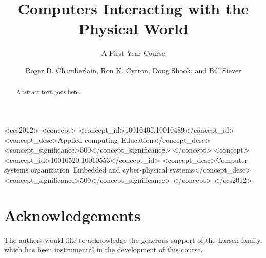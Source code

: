 \documentclass[sigconf]{acmart}
\begin{document}
\title{Computers Interacting with the Physical World}
\subtitle{A First-Year Course}


\author{Roger D. Chamberlain, Ron K. Cytron, Doug Shook, and Bill Siever}


\renewcommand{\shortauthors}{R. D. Chamberlain et al.}

\newcommand{\FIXME}[1]{\textcolor{red}{FIXME: #1}}

\begin{abstract}
Abstract text goes here.
\end{abstract}

%
%
 \begin{CCSXML}
<ccs2012>
<concept>
<concept_id>10010405.10010489</concept_id>
<concept_desc>Applied computing~Education</concept_desc>
<concept_significance>500</concept_significance>
</concept>
<concept>
<concept_id>10010520.10010553</concept_id>
<concept_desc>Computer systems organization~Embedded and cyber-physical systems</concept_desc>
<concept_significance>500</concept_significance>
</concept>
</ccs2012>
\end{CCSXML}





\maketitle








\section*{Acknowledgements}
The authors would like to acknowledge
the generous support of the Larsen family, which has been instrumental
in the development of this course.



\end{document}
